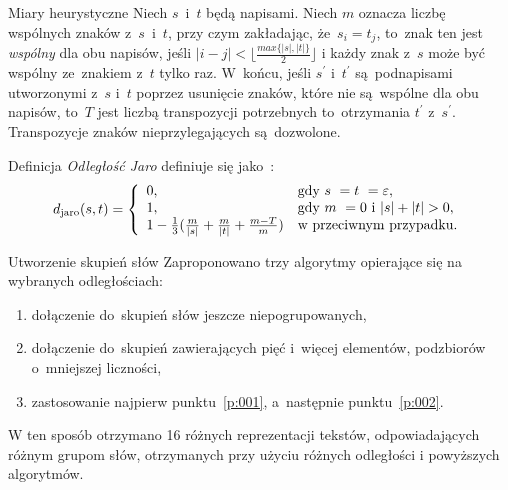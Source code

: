 \documentclass[11pt,pdftex,mathserif]{beamer}
\theoremstyle{definition}
\begin{document}
\begin{frame}{Miary heurystyczne}
Niech $s$~i~$t$ będą napisami. Niech $m$ oznacza liczbę wspólnych znaków z~$s$~i~$t$, przy czym zakładając, że~$s_i = t_j$, to~znak ten jest \emph{wspólny} dla obu napisów, jeśli $ |i -j| < \lfloor\frac{max\{|s|, |t|\}}{2}\rfloor$
i każdy znak z~$s$ może być wspólny ze~znakiem z~$t$ tylko raz. W~końcu, jeśli $s^\prime$ i~$t^\prime$ są~podnapisami utworzonymi z~$s$ i~$t$ poprzez usunięcie znaków, które nie są~wspólne dla obu napisów, to~$T$ jest liczbą transpozycji potrzebnych to~otrzymania $t^\prime$ z~$s^\prime$. Transpozycje znaków nieprzylegających są~dozwolone.
\begin{block}{Definicja}
\emph{Odległość Jaro} definiuje się jako~\cite{Loo2014:stringdist}:
\begin{equation*}
\label{eq:011}
d_{\mathrm{jaro}}(s,t) = \left\{
\begin{array}{l l}     
    0, & \text{gdy } s~= t~= \varepsilon, \\
    1, & \text{gdy } m~= 0 \text{ i~} |s| + |t| > 0, \\
    1 - \frac{1}{3} (\frac{m}{|s|} + \frac{m}{|t|} + \frac{m - T}{m}) & \text{w przeciwnym przypadku}.
\end{array}\right.
\end{equation*}
\end{block}
\end{frame}

\begin{frame}{Utworzenie skupień słów}
Zaproponowano trzy algorytmy opierające się na wybranych odległościach:
\begin{enumerate}
\item\label{p:001} dołączenie do~skupień słów jeszcze niepogrupowanych,
\item\label{p:002} dołączenie do~skupień zawierających pięć i~więcej elementów, podzbiorów o~mniejszej liczności,
\item zastosowanie najpierw punktu~\ref{p:001}, a~następnie punktu~\ref{p:002}.
\end{enumerate}
\pause
W ten sposób otrzymano 16 różnych reprezentacji tekstów, odpowiadających różnym grupom słów, otrzymanych przy użyciu różnych odległości i powyższych algorytmów.
\end{frame}
\end{document}
